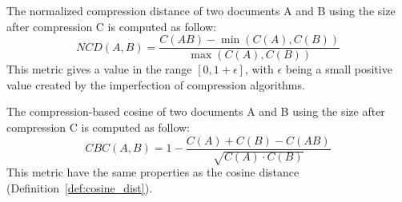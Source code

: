 \begin{definition}
  The normalized compression distance of two documents A and B using the size after compression C is computed as follow:
  \begin{equation}
    NCD(A, B) = \frac{C(AB) - \min(C(A), C(B))}{\max(C(A), C(B))}
  \end{equation}
  This metric gives a value in the range $\left[0, 1+\epsilon\right]$, with $\epsilon$ being a small positive value created by the imperfection of compression algorithms.
\end{definition}

\begin{definition}
  The compression-based cosine of two documents A and B using the size after compression C is computed as follow:
  \begin{equation}
    CBC(A, B) = 1 - \frac{C(A) + C(B) - C(AB)}{\sqrt{C(A) \cdot C(B)}}
  \end{equation}
  This metric have the same properties as the cosine distance (Definition~\ref{def:cosine_dist}).
\end{definition}
